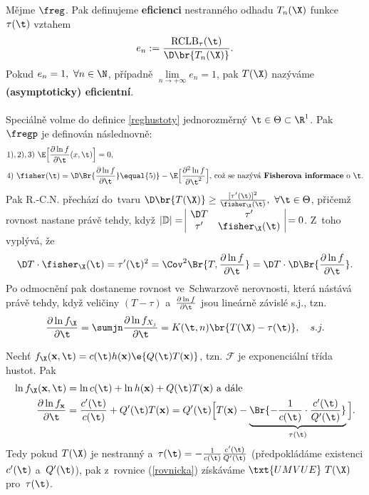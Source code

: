 \begin{define}
	Mějme $\freg$. Pak definujeme \textbf{eficienci} nestranného odhadu $T_n(\X)$ funkce $\tau(\t)$ vztahem 
	$$ e_n:=\frac{\mathrm{RCLB}_\tau(\t)}{\D\br{T_n(\X)}}. $$ Pokud $e_n=1,~\forall n\in\N$, případně $\lim\limits_{n\to+\infty}e_n=1$, pak $T(\X)$ nazýváme \textbf{(asymptoticky) eficientní}.
	\\ \\
	Speciálně volme do definice \ref{reghustoty} jednorozměrný $\t\in\Theta\subset\R^1$. Pak $\fregp$ je definován následnovně: \[
	\begin{split}
 &1),2),3)~\E\Big[\frac{\partial\ln f}{\partial\t}(x,\t)\Big]=0, \\
	&4)~\fisher(\t)=\D\Br{\frac{\partial\ln f}{\partial\t}}\equal{5)}-\E\Big[\frac{\partial^2\ln f}{\partial\t^2}\Big]\text{, což se~nazývá \textbf{Fisherova informace} o~}\t.
	\end{split}
	\]
	Pak R.-C.N. přechází do~tvaru $\D\br{T(\X)}\geq \frac{[\tau'(\t)]^2}{\fisher_\X(\t)},~\forall\t\in\Theta$, přičemž  rovnost nastane právě tehdy, když $|\mathbb{D}|=\begin{array}{|cc|}
	\D T & \tau' \\ 
	\tau' & \fisher_\X(\t)
	\end{array}=0 $. Z~toho vyplývá, že  
	$$\D T\cdot\fisher_\X(\t)=
	\tau'(\t)^2=
	\Cov^2\Br{T,\frac{\partial\ln f}{\partial\t}}=
	\D T\cdot\D\Br{\frac{\partial\ln f}{\partial\t}}.$$ 
	Po odmocnění pak dostaneme rovnost ve~Schwarzově nerovnosti, která nástává právě tehdy, když veličiny $(T-\tau)$ a~$\frac{\partial\ln f}{\partial\t}$ jsou lineárně závislé s.j., tzn.
	\begin{equation}\label{rovnicka}
	\frac{\partial\ln f_\X}{\partial\t}=\sumjn\frac{\partial\ln f_{X_j}}{\partial\t}=K(\t,n)\br{T(\X)-\tau(\t)},\quad s.j.
	\end{equation} 
\end{define}
\begin{example}
	Nechť $f_\X(\textbf{x},\t)=c(\t)h(\textbf{x})\e{Q(\t)T(\textbf{x})}$, tzn. $\mathcal{F}$ je exponenciální třída hustot. Pak \[
	\begin{split}
	\ln f_\X(\textbf{x},\t)&=\ln c(\t)+\ln h(\textbf{x}) +Q(\t)T(\textbf{x})\text{ a~dále} \\
	\frac{\partial\ln f_\textbf{x}}{\partial\t}&=\frac{c'(\t)}{c(\t)}+Q'(\t)T(\textbf{x})=Q'(\t)\Big[ T(\textbf{x})-\underbrace{\Br{-\frac{1}{c(\t)}\cdot \frac{c'(\t)}{Q'(\t)}}}_{\tau(\t)} \Big].
	\end{split}
	\]
	Tedy pokud $T(\X)$ je nestranný a~$\tau(\t)=-\frac{1}{c(\t)}\frac{c'(\t)}{Q'(\t)}$ (předpokládáme existenci $c'(\t)$ a~$Q'(\t)$), pak z~rovnice (\ref{rovnicka}) získáváme $\txt{UMVUE}~T(\X)$ pro~$\tau(\t)$.
\end{example}
